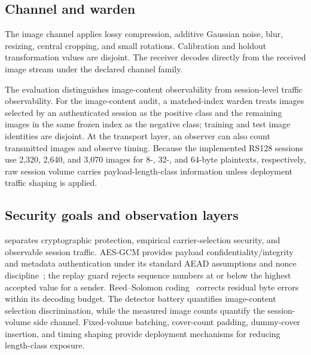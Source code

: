 \subsection{Channel and warden}
The image channel applies lossy compression, additive Gaussian noise, blur, resizing, central cropping, and small rotations. Calibration and holdout transformation values are disjoint. The receiver decodes directly from the received image stream under the declared channel family.

The evaluation distinguishes image-content observability from session-level traffic observability. For the image-content audit, a matched-index warden treats images selected by an authenticated session as the positive class and the remaining images in the same frozen index as the negative class; training and test image identities are disjoint. At the transport layer, an observer can also count transmitted images and observe timing. Because the implemented RS128 sessions use 2,320, 2,640, and 3,070 images for 8-, 32-, and 64-byte plaintexts, respectively, raw session volume carries payload-length-class information unless deployment traffic shaping is applied.

\subsection{Security goals and observation layers}
\method separates cryptographic protection, empirical carrier-selection security, and observable session traffic. AES-GCM provides payload confidentiality/integrity and metadata authentication under its standard AEAD assumptions and nonce discipline~\cite{dworkin2007gcm}; the replay guard rejects sequence numbers at or below the highest accepted value for a sender. Reed--Solomon coding~\cite{reed1960codes} corrects residual byte errors within its decoding budget. The detector battery quantifies image-content selection discrimination, while the measured image counts quantify the session-volume side channel. Fixed-volume batching, cover-count padding, dummy-cover insertion, and timing shaping provide deployment mechanisms for reducing length-class exposure.

